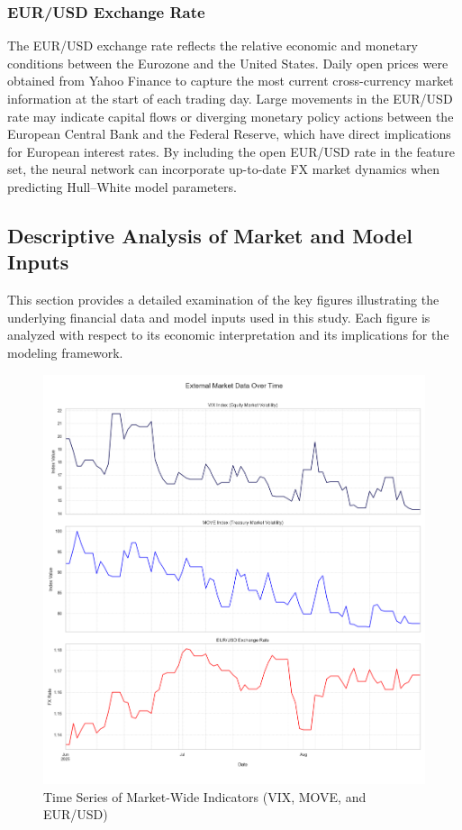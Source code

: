 \subsubsection{EUR/USD Exchange Rate}
The EUR/USD exchange rate reflects the relative economic and monetary conditions between the Eurozone and the United States. Daily open prices were obtained from Yahoo Finance to capture the most current cross-currency market information at the start of each trading day. Large movements in the EUR/USD rate may indicate capital flows or diverging monetary policy actions between the European Central Bank and the Federal Reserve, which have direct implications for European interest rates. By including the open EUR/USD rate in the feature set, the neural network can incorporate up-to-date FX market dynamics when predicting Hull–White model parameters.

\subsection{Descriptive Analysis of Market and Model Inputs}
This section provides a detailed examination of the key figures illustrating the underlying financial data and model inputs used in this study. Each figure is analyzed with respect to its economic interpretation and its implications for the modeling framework.

\begin{figure}[H]
	\centering
	\includegraphics[width=1\textwidth]{images/descriptive_data_analysis/external_data_time_series.png}
	\caption{Time Series of Market-Wide Indicators (VIX, MOVE, and EUR/USD)}
	\label{fig:external_data_time_series}
\end{figure}

